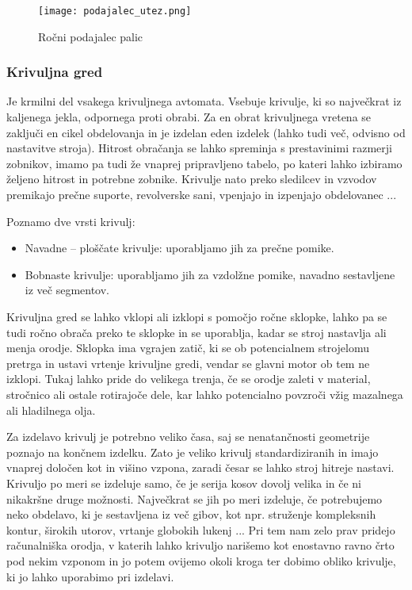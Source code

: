 \begin{figure}[H]
	\begin{center}
		\texttt{[image: podajalec\_utez.png]}
		\caption{Ročni podajalec palic
			\cite{interna}}
		\label{shema_rocnega_podajalca}
	\end{center}
\end{figure}

\subsubsection{Krivuljna gred}
Je krmilni del vsakega krivuljnega avtomata. Vsebuje krivulje,
ki so največkrat iz kaljenega jekla, odpornega proti obrabi. Za en
obrat krivuljnega vretena se zaključi en cikel obdelovanja in je
izdelan eden izdelek (lahko tudi več, odvisno od nastavitve stroja).
Hitrost obračanja se lahko spreminja s prestavinimi razmerji
zobnikov, imamo pa tudi že vnaprej pripravljeno tabelo, po kateri
lahko izbiramo željeno hitrost in potrebne zobnike. Krivulje nato
preko sledilcev in vzvodov premikajo prečne suporte,
revolverske sani, vpenjajo in izpenjajo obdelovanec ...

\noindent Poznamo dve vrsti krivulj:
\begin{itemize}
	\item Navadne -- ploščate krivulje: uporabljamo jih za prečne pomike.
	\item Bobnaste krivulje: uporabljamo jih za vzdolžne pomike, navadno
	      sestavljene iz več segmentov.
\end{itemize}

Krivuljna gred se lahko vklopi ali izklopi s pomočjo ročne sklopke,
lahko pa se tudi ročno obrača preko te sklopke in se uporablja, kadar
se stroj nastavlja ali menja orodje. Sklopka ima vgrajen
zatič, ki se ob potencialnem strojelomu pretrga in ustavi vrtenje
krivuljne gredi, vendar se glavni motor ob tem ne izklopi.
Tukaj lahko pride do velikega trenja, če se orodje zaleti v
material, stročnico ali ostale rotirajoče dele, kar lahko
potencialno povzroči vžig mazalnega ali hladilnega olja.

Za izdelavo krivulj je potrebno veliko časa, saj
se nenatančnosti geometrije poznajo na končnem izdelku. Zato je
veliko krivulj standardiziranih in imajo vnaprej določen kot in
višino vzpona, zaradi česar se lahko stroj hitreje nastavi. Krivuljo po
meri se izdeluje samo, če je serija kosov dovolj velika in če ni
nikakršne druge možnosti. Največkrat se jih po meri izdeluje,
če potrebujemo neko obdelavo, ki je sestavljena iz več gibov,
kot npr. struženje kompleksnih kontur, širokih utorov, vrtanje
globokih lukenj ... Pri tem nam zelo prav pridejo računalniška
orodja, v katerih lahko krivuljo narišemo kot enostavno ravno
črto pod nekim vzponom in jo potem ovijemo okoli kroga ter dobimo
obliko krivulje, ki jo lahko uporabimo pri izdelavi.
